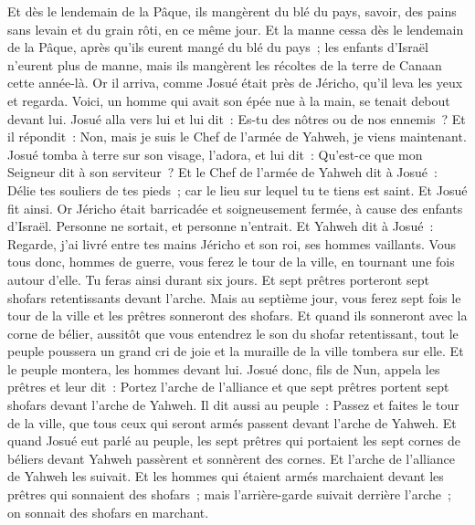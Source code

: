 \begin{multicols}{2}
Et dès le lendemain de la Pâque, ils mangèrent du blé du pays, savoir, des pains sans levain et du grain rôti, en ce même jour.
Et la manne cessa dès le lendemain de la Pâque, après qu'ils eurent mangé du blé du pays~; les enfants d'Israël n'eurent plus de manne, mais ils mangèrent les récoltes de la terre de Canaan cette année-là.
Or il arriva, comme Josué était près de Jéricho, qu'il leva les yeux et regarda. Voici, un homme qui avait son épée nue à la main, se tenait debout devant lui. Josué alla vers lui et lui dit~: Es-tu des nôtres ou de nos ennemis~?
Et il répondit~: Non, mais je suis le Chef de l'armée de Yahweh, je viens maintenant. Josué tomba à terre sur son visage, l'adora, et lui dit~: Qu'est-ce que mon Seigneur dit à son serviteur~?
Et le Chef de l'armée de Yahweh dit à Josué~: Délie tes souliers de tes pieds~; car le lieu sur lequel tu te tiens est saint. Et Josué fit ainsi.
\VerseOne{}Or Jéricho était barricadée et soigneusement fermée, à cause des enfants d'Israël. Personne ne sortait, et personne n'entrait.
Et Yahweh dit à Josué~: Regarde, j'ai livré entre tes mains Jéricho et son roi, ses hommes vaillants.
Vous tous donc, hommes de guerre, vous ferez le tour de la ville, en tournant une fois autour d'elle. Tu feras ainsi durant six jours.
Et sept prêtres porteront sept shofars retentissants devant l'arche. Mais au septième jour, vous ferez sept fois le tour de la ville et les prêtres sonneront des shofars.
Et quand ils sonneront avec la corne de bélier, aussitôt que vous entendrez le son du shofar retentissant, tout le peuple poussera un grand cri de joie et la muraille de la ville tombera sur elle. Et le peuple montera, les hommes devant lui.
Josué donc, fils de Nun, appela les prêtres et leur dit~: Portez l'arche de l'alliance et que sept prêtres portent sept shofars devant l'arche de Yahweh.
Il dit aussi au peuple~: Passez et faites le tour de la ville, que tous ceux qui seront armés passent devant l'arche de Yahweh.
Et quand Josué eut parlé au peuple, les sept prêtres qui portaient les sept cornes de béliers devant Yahweh passèrent et sonnèrent des cornes. Et l'arche de l'alliance de Yahweh les suivait.
Et les hommes qui étaient armés marchaient devant les prêtres qui sonnaient des shofars~; mais l'arrière-garde suivait derrière l'arche~; on sonnait des shofars en marchant.

\end{multicols}
